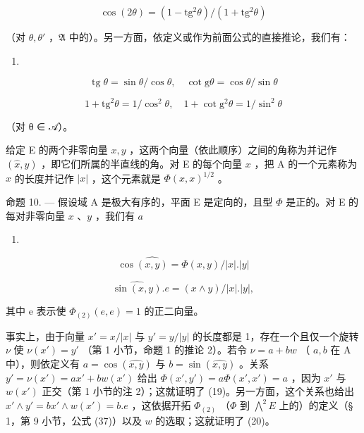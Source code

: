 \[
\cos (2 \theta) = (1 - \mathrm{tg} ^ {2} \theta) / (1 + \mathrm{tg} ^ {2} \theta)
\]

（对 \(\theta, \theta'\) ，\(\mathfrak{A}\) 中的）。另一方面，依定义或作为前面公式的直接推论，我们有：

\begin{enumerate}
\def\labelenumi{(\arabic{enumi})}
\setcounter{enumi}{16}
\tightlist
\item
\end{enumerate}

\[
\operatorname{tg} \theta = \sin \theta / \cos \theta , \quad \cot \mathrm{g} \theta = \cos \theta / \sin \theta\tag{18}
\]

\[
1 + \mathrm{tg} ^ {2} \theta = 1 / \cos^ {2} \theta , \quad 1 + \cot \mathrm{g} ^ {2} \theta = 1 / \sin^ {2} \theta
\]

（对 θ ∈ 𝒜）。

给定 E 的两个非零向量 \(x, y\) ，这两个向量（依此顺序）之间的角称为并记作 \((\widehat{x}, y)\) ，即它们所属的半直线的角。对 E 的每个向量 \(x\) ，把 A 的一个元素称为 \(x\) 的长度并记作 \(|x|\) ，这个元素就是 \(\Phi(x, x)^{1/2}\) 。

命题 10. --- 假设域 A 是极大有序的，平面 E 是定向的，且型 \(\Phi\) 是正的。对 E 的每对非零向量 \(x\) 、\(y\) ，我们有 \(a\)

\begin{enumerate}
\def\labelenumi{(\arabic{enumi})}
\setcounter{enumi}{18}
\tightlist
\item
\end{enumerate}

\[
\cos \widehat {(x , y)} = \Phi (x, y) / | x |. | y |\tag{20}
\]

\[
\widehat {\sin (x , y)}. e = (x \wedge y) / | x |. | y |,
\]

其中 e 表示使 \(\Phi_{(2)}(e, e) = 1\) 的正二向量。

事实上，由于向量 \(x' = x / |x|\) 与 \(y' = y / |y|\) 的长度都是 1，存在一个且仅一个旋转 \(\nu\) 使 \(\nu(x') = y'\) （第 1 小节，命题 1 的推论 2）。若令 \(\nu = a + bw\) （ \(a, b\) 在 A 中），则依定义有 \(a = \cos(\widehat{x,y})\) 与 \(b = \sin(\widehat{x,y})\) 。关系 \(y' = \nu(x') = ax' + bw(x')\) 给出 \(\Phi(x', y') = a\Phi(x', x') = a\) ，因为 \(x'\) 与 \(w(x')\) 正交（第 1 小节的注 2）；这就证明了 (19)。另一方面，这个关系也给出 \(x' \wedge y' = bx' \wedge w(x') = b.e\) ，这依据开拓 \(\Phi_{(2)}\) （\(\Phi\) 到 \(\bigwedge^{2} E\) 上的）的定义（§ 1，第 9 小节，公式 (37)）以及 \(w\) 的选取；这就证明了 (20)。

